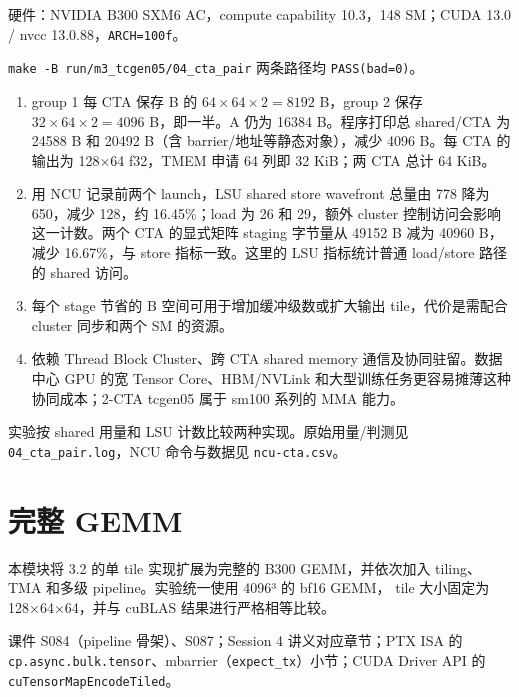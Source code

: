 \documentclass[11pt,a4paper,fontset=fandol]{ctexart}
\begin{document}
\begin{answer}

硬件：NVIDIA B300 SXM6 AC，compute capability 10.3，148 SM；CUDA 13.0 /
nvcc 13.0.88，\texttt{ARCH=\allowbreak{}100f}。

\texttt{make\ -\allowbreak{}B\ run/\allowbreak{}m3\_\allowbreak{}tcgen05/\allowbreak{}04\_\allowbreak{}cta\_\allowbreak{}pair}
两条路径均 \texttt{PASS(bad=\allowbreak{}0)}。

\begin{enumerate}
\def\labelenumi{(\alph{enumi})}
\item
  group 1 每 CTA 保存 B 的 \(64\times64\times2=8192\) B，group 2 保存
  \(32\times64\times2=4096\) B，即一半。A 仍为 16384 B。程序打印总
  shared/CTA 为 24588 B 和 20492 B（含 barrier/地址等静态对象），减少
  4096 B。每 CTA 的输出为 128×64 f32，TMEM 申请 64 列即 32 KiB；两 CTA
  总计 64 KiB。
\item
  用 NCU 记录前两个 launch，LSU shared store wavefront 总量由 778 降为
  650，减少 128，约 16.45\%；load 为 26 和 29，额外 cluster
  控制访问会影响这一计数。两个 CTA 的显式矩阵 staging 字节量从 49152 B
  减为 40960 B，减少 16.67\%，与 store 指标一致。这里的 LSU 指标统计普通
  load/store 路径的 shared 访问。
\item
  每个 stage 节省的 B 空间可用于增加缓冲级数或扩大输出
  tile，代价是需配合 cluster 同步和两个 SM 的资源。
\item
  依赖 Thread Block Cluster、跨 CTA shared memory
  通信及协同驻留。数据中心 GPU 的宽 Tensor Core、HBM/NVLink
  和大型训练任务更容易摊薄这种协同成本；2-CTA tcgen05 属于 sm100 系列的
  MMA 能力。
\end{enumerate}

实验按 shared 用量和 LSU 计数比较两种实现。原始用量/判测见
\texttt{04\_\allowbreak{}cta\_\allowbreak{}pair.\allowbreak{}log}，NCU
命令与数据见 \texttt{ncu-\allowbreak{}cta.\allowbreak{}csv}。

\end{answer}

\section{完整 GEMM}\label{ux5b8cux6574-gemm}

本模块将 3.2 的单 tile 实现扩展为完整的 B300 GEMM，并依次加入
tiling、TMA 和多级 pipeline。实验统一使用 4096³ 的 bf16 GEMM， tile
大小固定为 128×64×64，并与 cuBLAS 结果进行严格相等比较。

\begin{reading}

课件 S084（pipeline 骨架）、S087；Session 4 讲义对应章节；PTX ISA 的
\texttt{cp.\allowbreak{}async.\allowbreak{}bulk.\allowbreak{}tensor}、mbarrier（\texttt{expect\_\allowbreak{}tx}）小节；CUDA
Driver API 的 \texttt{cuTensorMapEncodeTiled}。

\end{reading}
\end{document}
